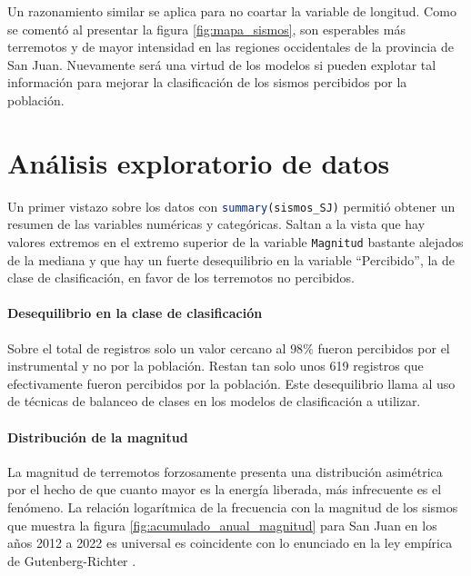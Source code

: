\documentclass[a4paper]{report}
\begin{document}
Un razonamiento similar se aplica para no coartar la variable de longitud.
Como se comentó al presentar la figura \ref{fig:mapa_sismos}, son esperables más terremotos y de mayor intensidad en las regiones occidentales de la provincia de San Juan.
Nuevamente será una virtud de los modelos si pueden explotar tal información para mejorar la clasificación de los sismos percibidos por la población.







\section{Análisis exploratorio de datos}\label{sec:AED}

Un primer vistazo sobre los datos con \lstinline[language=R,breaklines=true,basicstyle=\ttfamily]'summary(sismos_SJ)' permitió obtener un resumen de las variables numéricas y categóricas.
Saltan a la vista que hay valores extremos en el extremo superior de la variable \lstinline[language=R,breaklines=true,basicstyle=\ttfamily]'Magnitud' bastante alejados de la mediana y que hay un fuerte desequilibrio en la variable ``Percibido'', la de clase de clasificación, en favor de los terremotos no percibidos.


\paragraph{Desequilibrio en la clase de clasificación}
Sobre el total de registros solo un valor cercano al \(98\%\) fueron percibidos por el instrumental y no por la población.
Restan tan solo unos \num{619} registros que efectivamente fueron percibidos por la población.
Este desequilibrio llama al uso de técnicas de balanceo de clases en los modelos de clasificación a utilizar.


\paragraph{Distribución de la magnitud}
La magnitud de terremotos forzosamente presenta una distribución asimétrica por el hecho de que cuanto mayor es la energía liberada, más infrecuente es el fenómeno.
La relación logarítmica de la frecuencia con la magnitud de los sismos que muestra la figura \ref{fig:acumulado_anual_magnitud} para San Juan en los años 2012 a 2022 es universal es coincidente con lo enunciado en la ley empírica de Gutenberg-Richter \cite[ec. 4.24]{fowler_solid_1990}.
\end{document}
